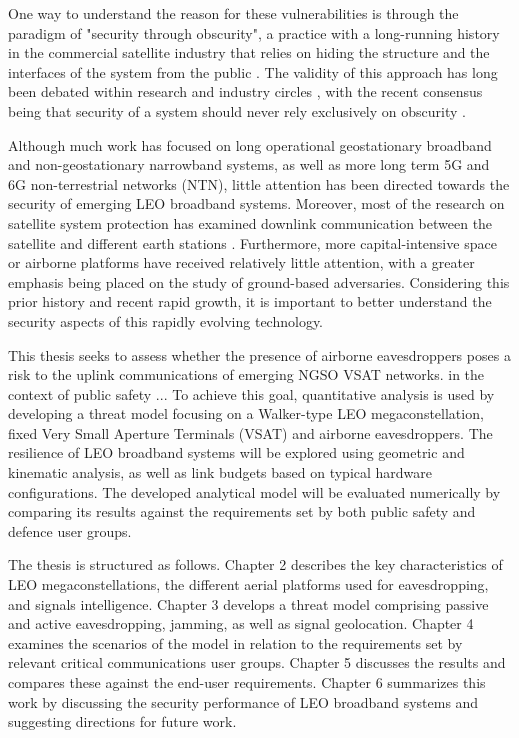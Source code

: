 \documentclass[english, 12pt, a4paper, elec, utf8, a-1b, online]{aaltothesis}
\begin{document}
One way to understand the reason for these vulnerabilities is through the paradigm of "security through obscurity", a practice with a long-running history in the commercial satellite industry that relies on hiding the structure and the interfaces of the system from the public \cite{lin2022defending}.
The validity of this approach has long been debated within research and industry circles \cite{johansson2008great}, with the recent consensus being that security of a system should never rely exclusively on obscurity \cite{diehl2016law, guo2018defending}.

Although much work has focused on long operational geostationary broadband and non-geostationary narrowband systems, as well as more long term 5G and 6G non-terrestrial networks (NTN), little attention has been directed towards the security of emerging LEO broadband systems.
Moreover, most of the research on satellite system protection has examined downlink communication between the satellite and different earth stations \cite{abdelsalam2023physical}.
Furthermore, more capital-intensive space or airborne platforms have received relatively little attention, with a greater emphasis being placed on the study of ground-based adversaries.
Considering this prior history and recent rapid growth, it is important to better understand the security aspects of this rapidly evolving technology. 

This thesis seeks to assess whether the presence of airborne eavesdroppers poses a risk to the uplink communications of emerging NGSO VSAT networks. in the context of public safety ...
To achieve this goal, quantitative analysis is used by developing a threat model focusing on a Walker-type LEO megaconstellation, fixed Very Small Aperture Terminals (VSAT) and airborne eavesdroppers.
The resilience of LEO broadband systems will be explored using geometric and kinematic analysis, as well as link budgets based on typical hardware configurations.
The developed analytical model will be evaluated numerically by comparing its results against the requirements set by both public safety and defence user groups.

The thesis is structured as follows.
Chapter 2 describes the key characteristics of LEO megaconstellations, the different aerial platforms used for eavesdropping, and signals intelligence.
Chapter 3 develops a threat model comprising passive and active eavesdropping, jamming, as well as signal geolocation.
Chapter 4 examines the scenarios of the model in relation to the requirements set by relevant critical communications user groups.
Chapter 5 discusses the results and compares these against the end-user requirements.
Chapter 6 summarizes this work by discussing the security performance of LEO broadband systems and suggesting directions for future work.
\end{document}
